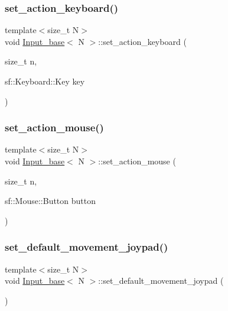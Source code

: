 \subsubsection{\texorpdfstring{set\+\_\+action\+\_\+keyboard()}{set\_action\_keyboard()}}
{\footnotesize\ttfamily template$<$size\+\_\+t N$>$ \\
void \hyperlink{class_input__base}{Input\+\_\+base}$<$ N $>$\+::set\+\_\+action\+\_\+keyboard (\begin{DoxyParamCaption}\item[{size\+\_\+t}]{n,  }\item[{sf\+::\+Keyboard\+::\+Key}]{key }\end{DoxyParamCaption})}

\mbox{\label{class_input__base_aa5600e81056832d37167aec2ff0034a4}} 
\subsubsection{\texorpdfstring{set\+\_\+action\+\_\+mouse()}{set\_action\_mouse()}}
{\footnotesize\ttfamily template$<$size\+\_\+t N$>$ \\
void \hyperlink{class_input__base}{Input\+\_\+base}$<$ N $>$\+::set\+\_\+action\+\_\+mouse (\begin{DoxyParamCaption}\item[{size\+\_\+t}]{n,  }\item[{sf\+::\+Mouse\+::\+Button}]{button }\end{DoxyParamCaption})}

\mbox{\label{class_input__base_a50d1a01cf671110d8b73c7b48b18095f}} 
\subsubsection{\texorpdfstring{set\+\_\+default\+\_\+movement\+\_\+joypad()}{set\_default\_movement\_joypad()}}
{\footnotesize\ttfamily template$<$size\+\_\+t N$>$ \\
void \hyperlink{class_input__base}{Input\+\_\+base}$<$ N $>$\+::set\+\_\+default\+\_\+movement\+\_\+joypad (\begin{DoxyParamCaption}{ }\end{DoxyParamCaption})}

